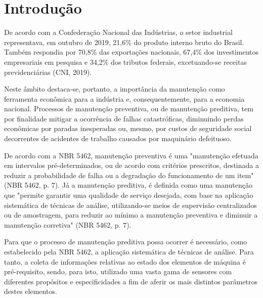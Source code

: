 \documentclass[
	12pt,				
	oneside,			
	a4paper,			
	english,			
	brazil,			
	]{abntex2ppgsi}
\begin{document}
\tableofcontents*
\cleardoublepage


\textual




\chapter{Introdução}
De acordo com a Confederação Nacional das Indústrias, o setor industrial representava, em outubro de 2019, 21,6\% do produto interno bruto do Brasil. Também respondia por 70,8\% das exportações nacionais, 67,4\% dos investimentos empresariais em pesquisa  e 34,2\% dos tributos federais, excetuando-se receitas previdenciárias (CNI, 2019). 

Neste âmbito destaca-se, portanto, a importância da manutenção como ferramenta econômica para a indústria e, consequentemente, para a economia nacional. Processos de manutenção preventiva, ou de manutenção preditiva, tem por finalidade mitigar a ocorrência de falhas catastróficas, diminuindo perdas econômicas por paradas inesperadas ou, mesmo, por custos de seguridade social decorrentes de acidentes de trabalho causados por maquinário defeituoso.

De acordo com a NBR 5462, manutenção preventiva é uma "manutenção efetuada em intervalos pré-determinados, ou de acordo com critérios prescritos, destinada a reduzir a probabilidade de falha ou a degradação do funcionamento de um item" (NBR 5462, p. 7). Já a manutenção preditiva, é definida como uma manutenção que "permite garantir uma qualidade de serviço desejada, com base na aplicação sistemática de técnicas de análise, utilizando-se meios de supervisão centralizados ou de amostragem, para reduzir ao mínimo a manutenção preventiva e diminuir a manutenção corretiva" (NBR 5462, p. 7). 

Para que o processo de manutenção preditiva possa ocorrer é necessário, como estabelecido pela NBR 5462, a aplicação sistemática de técnicas de análise. Para tanto, a coleta de informações relativas ao estado dos elementos de máquina é pré-requisito, sendo, para isto, utilizado uma vasta gama de sensores com diferentes propósitos e especificidades a fim de aferir os mais distintos parâmetros destes elementos. 
\end{document}
